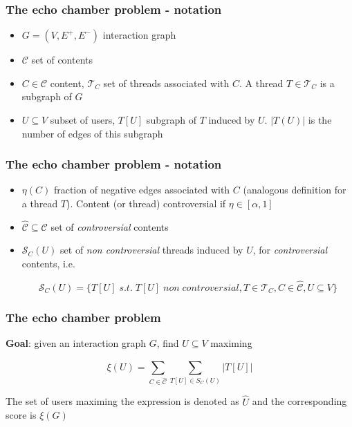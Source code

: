 \documentclass{beamer}
\begin{document}
\begin{frame}[c]
    \frametitle{The echo chamber problem - notation}
    \begin{itemize}
        \item $G = (V, E ^{+}, E ^{-}) $ interaction graph
        \item $ \mathcal{C} $ set of contents
        \item $C \in \mathcal{C} $ content, $\mathcal{T} _{C} $ set of threads
            associated with $C$. A thread $T \in \mathcal{T} _{C} $ is a
            subgraph of $G$
        \item $U \subseteq V$ subset of users, $T[U]$ subgraph of $T$ induced
            by $U$. $|T(U)|$ is the number of edges of this subgraph
    \end{itemize}
\end{frame}

\begin{frame}[c]
    \frametitle{The echo chamber problem - notation}
    \begin{itemize}
        \item $\eta(C)$ fraction of negative edges associated with $C$
            (analogous definition for a thread $T$). Content (or thread)
            controversial if $\eta \in [\alpha, 1]$
        \item $\hat{\mathcal{C} } \subseteq \mathcal{C} $ set of \textit{controversial}
            contents

        \item $\mathcal{S} _C (U)$ set of \textit{non controversial} threads
            induced by $U$, for \textit{controversial} contents, i.e.

            {\small
                \begin{equation}
                    \mathcal{S} _{C} (U) = \{ T[U] \; s.t. \; T[U] \; non \;
                        controversial, T \in \mathcal{T} _{C}, C
                    \in \hat{\mathcal{C}}, U \subseteq V\}
                \end{equation}
            }
    \end{itemize}

\end{frame}

\begin{frame}[c]
    \frametitle{The echo chamber problem}
    \textbf{Goal}: given an interaction graph $G$, find $U \subseteq V$ maximing

    \begin{equation}
        \xi (U) = \sum^{}_{C \in \hat{\mathcal{C}} } \sum^{}_{T[U] \in S_C (U)}
        | T[U] |
    \end{equation}

    The set of users maximing the expression is denoted as $\hat{U}$ and the
    corresponding score is $\xi(G)$
\end{frame}
\end{document}
